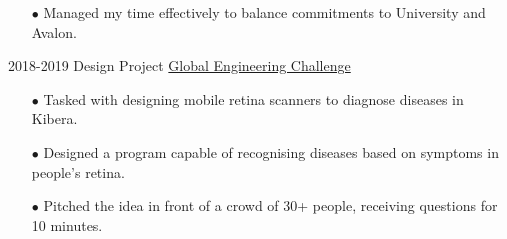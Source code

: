 \documentclass[9pt]{developercv} %
\begin{document}
\begin{entrylist}
{\begin{itemize}
				\item[$\bullet$\hspace*{0.5cm}] Managed my time effectively to balance commitments to University and Avalon.
			\end{itemize}		
		}
		\entry
		{2018-2019}
		{Design Project}
		{\href{https://www.sheffield.ac.uk/engineering/study/global-engineering-challenge}{Global Engineering Challenge}}
		{
			\begin{itemize}
				\item[$\bullet$\hspace*{0.5cm}] Tasked with designing mobile retina scanners to diagnose diseases in Kibera.
				\item[$\bullet$\hspace*{0.5cm}] Designed a program capable of recognising diseases based on symptoms in people's retina.
				\item[$\bullet$\hspace*{0.5cm}] Pitched the idea in front of a crowd of 30+ people, receiving questions for 10 minutes.
			\end{itemize}	
		}	
\end{entrylist}
\end{document}
